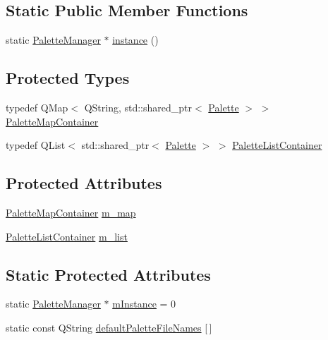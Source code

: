 \subsection*{Static Public Member Functions}
\begin{DoxyCompactItemize}
\item 
static \mbox{\hyperlink{class_palette_manager}{Palette\+Manager}} $\ast$ \mbox{\hyperlink{class_palette_manager_a56bdac299828aabbc7528f6844bb413b}{instance}} ()
\end{DoxyCompactItemize}
\subsection*{Protected Types}
\begin{DoxyCompactItemize}
\item 
typedef Q\+Map$<$ Q\+String, std\+::shared\+\_\+ptr$<$ \mbox{\hyperlink{class_palette}{Palette}} $>$ $>$ \mbox{\hyperlink{class_palette_manager_aa850f90513b7da9d828034105a1390e6}{Palette\+Map\+Container}}
\item 
typedef Q\+List$<$ std\+::shared\+\_\+ptr$<$ \mbox{\hyperlink{class_palette}{Palette}} $>$ $>$ \mbox{\hyperlink{class_palette_manager_ab2eef0ecf4e5473d79a6943ddaefe60f}{Palette\+List\+Container}}
\end{DoxyCompactItemize}
\subsection*{Protected Attributes}
\begin{DoxyCompactItemize}
\item 
\mbox{\hyperlink{class_palette_manager_aa850f90513b7da9d828034105a1390e6}{Palette\+Map\+Container}} \mbox{\hyperlink{class_palette_manager_a207d870982cd43c3e5100c7ce166d2fa}{m\+\_\+map}}
\item 
\mbox{\hyperlink{class_palette_manager_ab2eef0ecf4e5473d79a6943ddaefe60f}{Palette\+List\+Container}} \mbox{\hyperlink{class_palette_manager_a6ab389511971b0b7fc15524b7542ec77}{m\+\_\+list}}
\end{DoxyCompactItemize}
\subsection*{Static Protected Attributes}
\begin{DoxyCompactItemize}
\item 
static \mbox{\hyperlink{class_palette_manager}{Palette\+Manager}} $\ast$ \mbox{\hyperlink{class_palette_manager_a3effdec723c4def9fb3e79c10b211149}{m\+Instance}} = 0
\item 
static const Q\+String \mbox{\hyperlink{class_palette_manager_aa537fae54f41444668e70722e164a0ed}{default\+Palette\+File\+Names}} \mbox{[}$\,$\mbox{]}
\end{DoxyCompactItemize}


